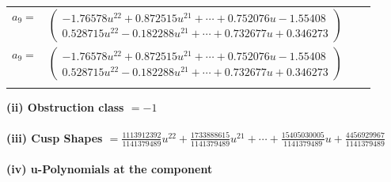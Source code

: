 \documentclass[1p]{elsarticle_modified}
\theoremstyle{definition}
\begin{document}
\begin{tabular}{m{7pt} m{180pt} m{7pt} m{180pt} }
\flushright $a_{9}=$&$\begin{pmatrix}-1.76578 u^{22}+0.872515 u^{21}+\cdots+0.752076 u-1.55408\\0.528715 u^{22}-0.182288 u^{21}+\cdots+0.732677 u+0.346273\end{pmatrix}$\\ \flushright $a_{9}=$&$\begin{pmatrix}-1.76578 u^{22}+0.872515 u^{21}+\cdots+0.752076 u-1.55408\\0.528715 u^{22}-0.182288 u^{21}+\cdots+0.732677 u+0.346273\end{pmatrix}$\\&\end{tabular}
\flushleft \textbf{(ii) Obstruction class $= -1$}\\~\\
\flushleft \textbf{(iii) Cusp Shapes $= \frac{1113912392}{1141379489} u^{22}+\frac{1733888615}{1141379489} u^{21}+\cdots+\frac{15405030005}{1141379489} u+\frac{4456929967}{1141379489}$}\\~\\
\newpage\renewcommand{\arraystretch}{1}
\flushleft \textbf{(iv) u-Polynomials at the component}\newline \\
\end{document}
